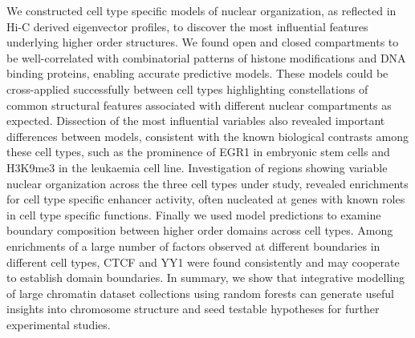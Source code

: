 \documentclass[a4paper,10pt,oneside]{book}
\begin{document}
We constructed cell type specific models of nuclear
organization, as reflected in Hi-C derived eigenvector profiles, to
discover the most influential features underlying higher order
structures. We found open and closed compartments to be
well-correlated with combinatorial patterns of histone modifications
and DNA binding proteins, enabling accurate predictive models. These
models could be cross-applied successfully between cell types
highlighting constellations of common structural features associated
with different nuclear compartments as expected. Dissection of the
most influential variables also revealed important differences between
models, consistent with the known biological contrasts among these
cell types, such as the prominence of EGR1 in embryonic stem cells and
H3K9me3 in the leukaemia cell line. Investigation of regions showing
variable nuclear organization across the three cell types under study,
revealed enrichments for cell type specific enhancer activity, often
nucleated at genes with known roles in cell type specific
functions. Finally we used model predictions to examine boundary
composition between higher order domains across cell types. Among
enrichments of a large number of factors observed at different
boundaries in different cell types, CTCF and YY1 were found
consistently and may cooperate to establish domain boundaries. In
summary, we show that integrative modelling of large chromatin dataset
collections using random forests can generate useful insights into
chromosome structure and seed testable hypotheses for further
experimental studies.

\ifstandalone
\begin{small}

\end{small}
\fi
\end{document}
